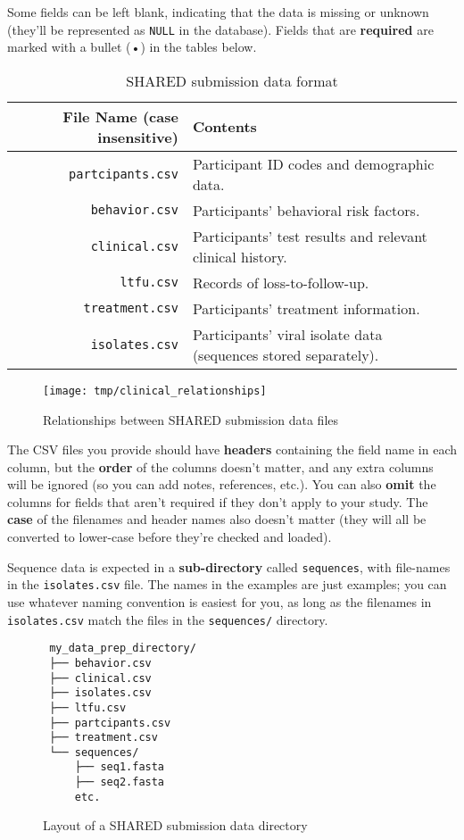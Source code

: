 \documentclass{article}
\begin{document}
Some fields can be left blank, indicating that the data is missing or
unknown (they'll be represented as \texttt{NULL} in the
database). Fields that are \textbf{required} are marked with a bullet
(•) in the tables below.


\begin{table}
  \caption{SHARED submission data format}
  \label{tbl:expectedfiles}
  \begin{tabular}{rp{8cm}}
    File Name (case insensitive) & Contents \\ \hline
    \verb|partcipants.csv| & Participant ID codes and demographic data. \\
    \verb|behavior.csv| &  Participants' behavioral risk factors. \\
    \verb|clinical.csv| & Participants' test results and relevant clinical history. \\
    \verb|ltfu.csv| & Records of loss-to-follow-up. \\
    \verb|treatment.csv| &  Participants' treatment information. \\
    \verb|isolates.csv| & Participants' viral isolate data (sequences stored separately). \\
  \end{tabular}
\end{table}

\begin{figure}
  \caption{Relationships between SHARED submission data files}
  \label{fig:relationships}
  \texttt{[image: tmp/clinical\_relationships]}
\end{figure}

The CSV files you provide should have \textbf{headers} containing the
field name in each column, but the \textbf{order} of the columns
doesn't matter, and any extra columns will be ignored (so you can add
notes, references, etc.). You can also \textbf{omit} the columns for
fields that aren't required if they don't apply to your study. The
\textbf{case} of the filenames and header names also doesn't matter
(they will all be converted to lower-case before they're checked and
loaded).

Sequence data is expected in a \textbf{sub-directory} called
\texttt{sequences}, with file-names in the \texttt{isolates.csv}
file. The names in the examples are just examples; you can use
whatever naming convention is easiest for you, as long as the
filenames in \texttt{isolates.csv} match the files in the
\texttt{sequences/} directory.

\begin{figure}
  \caption{Layout of a SHARED submission data directory}
  \label{fig:data-prep-dir}
\begin{verbatim}
 my_data_prep_directory/
 ├── behavior.csv
 ├── clinical.csv
 ├── isolates.csv
 ├── ltfu.csv
 ├── partcipants.csv
 ├── treatment.csv
 └── sequences/
     ├── seq1.fasta
     ├── seq2.fasta
     etc.
\end{verbatim}
\end{figure}
\end{document}

